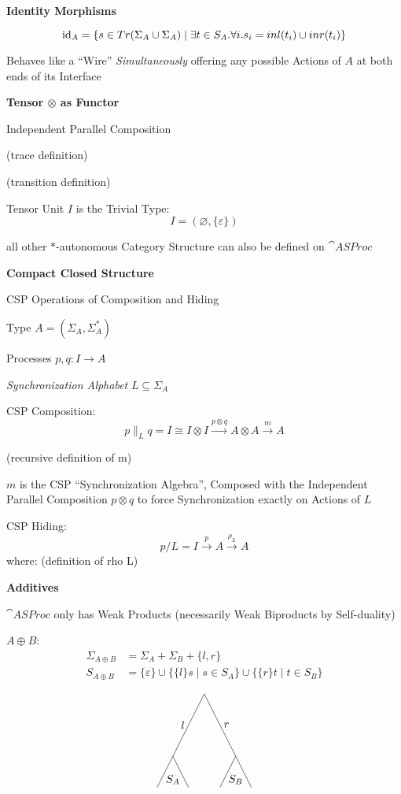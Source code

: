 \textbf{Identity Morphisms}

\[
  \mathrm{id}_A = \{s \in Tr(\Sigma_A \cup \Sigma_A)
    \mid \exists t \in S_A.\forall i.s_i = inl(t_i) \cup inr(t_i)\}
\]

Behaves like a ``Wire'' \emph{Simultaneously} offering any possible
Actions of $A$ at both ends of its Interface



\textbf{Tensor $\otimes$ as Functor}

Independent Parallel Composition

(trace definition) %

(transition definition)

Tensor Unit $I$ is the Trivial Type:
\[
  I = (\varnothing,\{\varepsilon\})
\]

all other $*$-autonomous Category Structure can also be defined on
$\cat{ASProc}$


\textbf{Compact Closed Structure}

CSP Operations of Composition and Hiding

Type $A = (\Sigma_A, \Sigma_A^*)$

Processes $p,q : I \rightarrow A$

\emph{Synchronization Alphabet} $L \subseteq \Sigma_A$

CSP Composition:
\[
  p \parallel_L q = I \cong I \otimes I
    \xrightarrow{p \otimes q} A \otimes A \xrightarrow{m} A
\]

(recursive definition of m) %

$m$ is the CSP ``Synchronization Algebra'', Composed with the
Independent Parallel Composition $p \otimes q$ to force
Synchronization exactly on Actions of $L$

CSP Hiding:
\[
  p/L = I \xrightarrow{p} A \xrightarrow{\rho_L} A
\]
where: (definition of rho L) %



\textbf{Additives}

$\cat{ASProc}$ only has Weak Products (necessarily Weak Biproducts by
Self-duality)

$A \oplus B$:
\begin{align*}
  \Sigma_{A \oplus B} &= \Sigma_A + \Sigma_B + \{l,r\} \\
  S_{A \oplus B} &= \{\varepsilon\} \cup \{\{l\}s
    \mid s \in S_A\} \cup \{\{r\}t \mid t \in S_B\}
\end{align*}

\[
\begin{tikzpicture}
  \coordinate (P) at (0,2);
  \coordinate (A) at (-1.0,0);
  \coordinate (A1) at (-1.5,-1.0);
  \coordinate (A2) at (-0.5,-1.0);
  \coordinate (B) at (1,0);
  \coordinate (B1) at (0.50,-1.0);
  \coordinate (B2) at (1.5,-1.0);
  \node (SA) at (-1.0,-0.75) {$S_A$};
  \node (SB) at (1.0,-0.75) {$S_B$};
  \draw[] (P) -- node [left] {$l$} (A);
  \draw[] (P) -- node [right] {$r$} (B);
  \draw[] (A) -- (A1);
  \draw[] (A) -- (A2);
  \draw[] (B) -- (B1);
  \draw[] (B) -- (B2);
\end{tikzpicture}
\]

